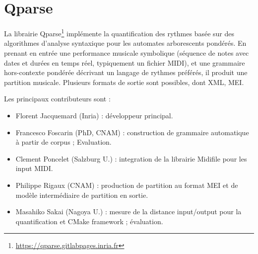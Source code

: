 \section{Qparse}
La librairie Qparse\footnote{\url{https://qparse.gitlabpages.inria.fr}} 
implémente la quantification des rythmes 
basée sur des algorithmes d'analyse syntaxique pour les automates arborescents pondérés. 
En prenant en entrée une performance musicale symbolique 
(séquence de notes avec dates et durées en temps réel, typiquement un fichier MIDI), 
et une grammaire 
hors-contexte pondérée décrivant un langage de rythmes préférés, 
il produit une partition musicale. 
Plusieurs formats de sortie sont possibles, dont XML, MEI.

Les principaux contributeurs sont :
\begin{itemize}
	\item Florent Jacquemard (Inria) : développeur principal.
	\item Francesco Foscarin (PhD, CNAM) :  construction de grammaire automatique 
	à partir de corpus ; Evaluation.
	\item Clement Poncelet (Salzburg U.) : integration de la librairie Midifile pour les input MIDI.
	\item Philippe Rigaux (CNAM) : production de partition au format MEI et de modèle intermédiaire de partition en sortie.
	\item Masahiko Sakai (Nagoya U.) : mesure de la distance input/output pour la quantification et CMake framework ; évaluation.
\end{itemize}

